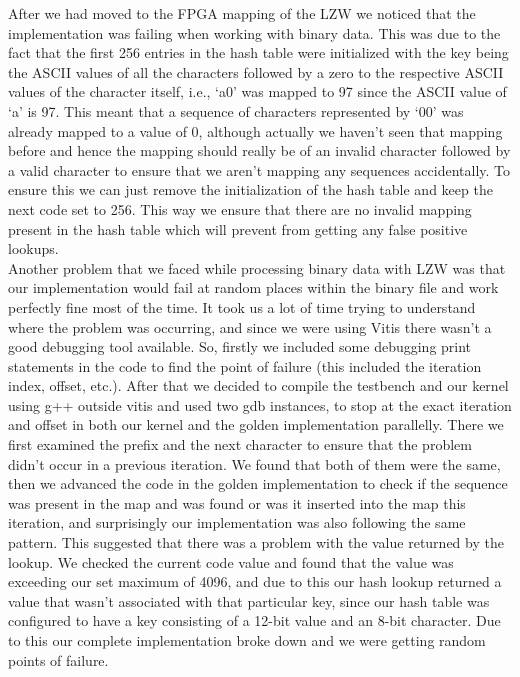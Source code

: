 \documentclass[../main.tex]{subfiles}
\begin{document}
\begin{enumerate}
\begin{itemize}
    After we had moved to the FPGA mapping of the LZW we noticed that the implementation was failing when working with binary data. This was due to the fact that the first 256 entries in the hash table were initialized with the key being the ASCII values of all the characters followed by a zero to the respective ASCII values of the character itself, i.e., ‘a0’ was mapped to 97 since the ASCII value of ‘a’ is 97. This meant that a sequence of characters represented by ‘00’ was already mapped to a value of 0, although actually we haven’t seen that mapping before and hence the mapping should really be of an invalid character followed by a valid character to ensure that we aren’t mapping any sequences accidentally. To ensure this we can just remove the initialization of the hash table and keep the next code set to 256. This way we ensure that there are no invalid mapping present in the hash table which will prevent from getting any false positive lookups. \\
    
    Another problem that we faced while processing binary data with LZW was that our implementation would fail at random places within the binary file and work perfectly fine most of the time. It took us a lot of time trying to understand where the problem was occurring, and since we were using Vitis there wasn’t a good debugging tool available. So, firstly we included some debugging print statements in the code to find the point of failure (this included the iteration index, offset, etc.). After that we decided to compile the testbench and our kernel using g++ outside vitis and used two gdb instances, to stop at the exact iteration and offset in both our kernel and the golden implementation parallelly. There we first examined the prefix and the next character to ensure that the problem didn’t occur in a previous iteration. We found that both of them were the same, then we advanced the code in the golden implementation to check if the sequence was present in the map and was found or was it inserted into the map this iteration, and surprisingly our implementation was also following the same pattern. This suggested that there was a problem with the value returned by the lookup. We checked the current code value and found that the value was exceeding our set maximum of 4096, and due to this our hash lookup returned a value that wasn’t associated with that particular key, since our hash table was configured to have a key consisting of a 12-bit value and an 8-bit character. Due to this our complete implementation broke down and we were getting random points of failure. \\
    

\end{itemize}
\end{enumerate}
\end{document}
